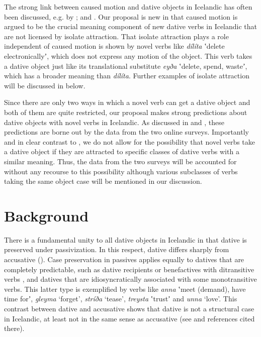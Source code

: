 \documentclass[output=paper,modfonts,nonflat,colorlinks,citecolor=brown]{langsci/langscibook}
\begin{document}
The strong link between caused motion and dative objects in Icelandic has often been discussed, e.g. by \citet{Barðdal2001, Barðdal2008, Svenonius2002, Maling2002}; and \citet{Jónsson2013a}. Our proposal is new in that caused motion is argued to be the crucial meaning component of new dative verbs in Icelandic that are not licensed by isolate attraction. That isolate attraction plays a role independent of caused motion is shown by novel verbs like \textit{dílíta} ʽdelete electronicallyʼ, which does not express any motion of the object. This verb takes a dative object just like its translational substitute \textit{eyða} ʽdelete, spend, wasteʼ, which has a broader meaning than \textit{dílíta}. Further examples of isolate attraction will be discussed in  below.

Since there are only two ways in which a novel verb can get a dative object and both of them are quite restricted, our proposal makes strong predictions about dative objects with novel verbs in Icelandic. As discussed in  and , these predictions are borne out by the data from the two online surveys. Importantly and in clear contrast to \citet{Barðdal2001, Barðdal2008}, we do not allow for the possibility that novel verbs take a dative object if they are attracted to specific classes of dative verbs with a similar meaning. Thus, the data from the two surveys will be accounted for without any recourse to this possibility although various subclasses of verbs taking the same object case will be mentioned in our discussion.

\section{Background} %
\label{sec:jonsson:2}

There is a fundamental unity to all dative objects in Icelandic in that dative is preserved under passivization. In this respect, dative differs sharply from accusative (\citealt{ZaenenMalingThráinsson1985}). Case preservation in passives applies equally to datives that are completely predictable, such as dative recipients or benefactives with ditransitive verbs \citep{Jónsson2000}, and datives that are idiosyncratically associated with some monotransitive verbs. This latter type is exemplified by verbs like \textit{anna} ʽmeet (demand), have time forʼ, \textit{gleyma} ‘forget’, \textit{stríða} ‘tease’, \textit{treysta} ʽtrustʼ and \textit{unna} ‘love’. This contrast between dative and accusative shows that dative is not a structural case in Icelandic, at least not in the same sense as accusative (see \citealt[181--192]{Thráinsson2007} and references cited there).
\end{document}

